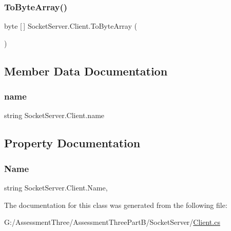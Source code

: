 \subsubsection{\texorpdfstring{To\+Byte\+Array()}{ToByteArray()}}
{\footnotesize\ttfamily byte \mbox{[}$\,$\mbox{]} Socket\+Server.\+Client.\+To\+Byte\+Array (\begin{DoxyParamCaption}{ }\end{DoxyParamCaption})\hspace{0.3cm}{\ttfamily [inline]}}



\subsection{Member Data Documentation}
\mbox{\label{class_socket_server_1_1_client_a9ba578b775f1217d70b08e344c279a8d}} 
\subsubsection{\texorpdfstring{name}{name}}
{\footnotesize\ttfamily string Socket\+Server.\+Client.\+name\hspace{0.3cm}{\ttfamily [private]}}



\subsection{Property Documentation}
\mbox{\label{class_socket_server_1_1_client_a239b5f307dd71e70bb2d90eaa0d6f88c}} 
\subsubsection{\texorpdfstring{Name}{Name}}
{\footnotesize\ttfamily string Socket\+Server.\+Client.\+Name\hspace{0.3cm}{\ttfamily [get]}, {\ttfamily [set]}}



The documentation for this class was generated from the following file\+:\begin{DoxyCompactItemize}
\item 
G\+:/\+Assessment\+Three/\+Assessment\+Three\+Part\+B/\+Socket\+Server/\hyperlink{_socket_server_2_client_8cs}{Client.\+cs}\end{DoxyCompactItemize}
